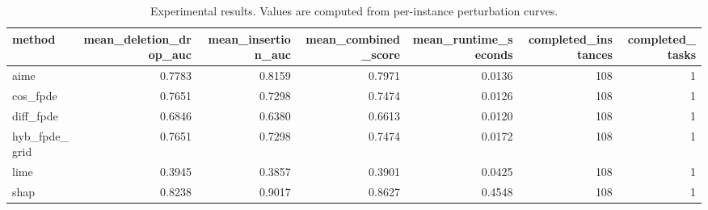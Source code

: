 \begin{table}[t]
\caption{Experimental results. Values are computed from per-instance perturbation curves.}
\label{tab:main_results_computed}
\centering
\begin{tabular}{lrrrrrr}
\toprule
method & mean\_deletion\_drop\_auc & mean\_insertion\_auc & mean\_combined\_score & mean\_runtime\_seconds & completed\_instances & completed\_tasks \\
\midrule
aime & 0.7783 & 0.8159 & 0.7971 & 0.0136 & 108 & 1 \\
cos\_fpde & 0.7651 & 0.7298 & 0.7474 & 0.0126 & 108 & 1 \\
diff\_fpde & 0.6846 & 0.6380 & 0.6613 & 0.0120 & 108 & 1 \\
hyb\_fpde\_grid & 0.7651 & 0.7298 & 0.7474 & 0.0172 & 108 & 1 \\
lime & 0.3945 & 0.3857 & 0.3901 & 0.0425 & 108 & 1 \\
shap & 0.8238 & 0.9017 & 0.8627 & 0.4548 & 108 & 1 \\
\bottomrule
\end{tabular}

\end{table}
